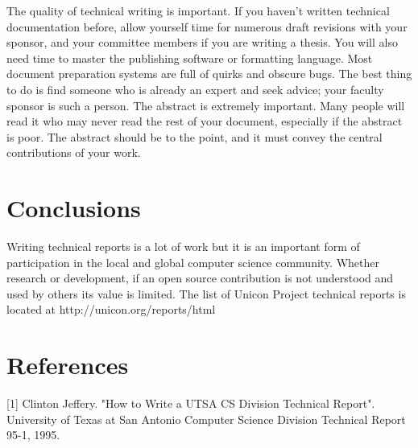 \documentclass[letterpaper,12pt]{article}
\begin{document}
The quality of technical writing is important. If you haven't written
technical documentation before, allow yourself time for numerous draft
revisions with your sponsor, and your committee members if you
are writing a thesis. You will also need time to master the
publishing software or formatting language. Most document preparation
systems are full of quirks and obscure bugs. The best thing to do is
find someone who is already an expert and seek advice; your faculty
sponsor is such a person.
The abstract is extremely important. Many people will read it
who may never read the rest of your document, especially if the
abstract is poor. The abstract should be to the point, and
it must convey the central contributions of your work.

\section{Conclusions}

Writing technical reports is a lot of work but it is an important form
of participation in the local and global computer science community.
Whether research or development, if an open source contribution is
not understood and used by others its value is limited.
The list of Unicon Project technical reports is located at
http://unicon.org/reports/html

\section*{References}

[1] Clinton Jeffery. "How to Write a UTSA CS Division Technical
Report". University of Texas at San Antonio Computer Science Division
Technical Report 95-1, 1995.
\end{document}

